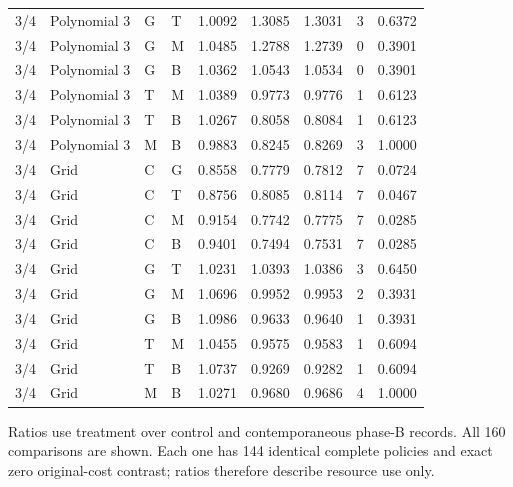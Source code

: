 \begin{longtable}{llllrrrrr}
3/4 & Polynomial 3 & G & T & 1.0092 & 1.3085 & 1.3031 & 3 & 0.6372 \\
3/4 & Polynomial 3 & G & M & 1.0485 & 1.2788 & 1.2739 & 0 & 0.3901 \\
3/4 & Polynomial 3 & G & B & 1.0362 & 1.0543 & 1.0534 & 0 & 0.3901 \\
3/4 & Polynomial 3 & T & M & 1.0389 & 0.9773 & 0.9776 & 1 & 0.6123 \\
3/4 & Polynomial 3 & T & B & 1.0267 & 0.8058 & 0.8084 & 1 & 0.6123 \\
3/4 & Polynomial 3 & M & B & 0.9883 & 0.8245 & 0.8269 & 3 & 1.0000 \\
3/4 & Grid & C & G & 0.8558 & 0.7779 & 0.7812 & 7 & 0.0724 \\
3/4 & Grid & C & T & 0.8756 & 0.8085 & 0.8114 & 7 & 0.0467 \\
3/4 & Grid & C & M & 0.9154 & 0.7742 & 0.7775 & 7 & 0.0285 \\
3/4 & Grid & C & B & 0.9401 & 0.7494 & 0.7531 & 7 & 0.0285 \\
3/4 & Grid & G & T & 1.0231 & 1.0393 & 1.0386 & 3 & 0.6450 \\
3/4 & Grid & G & M & 1.0696 & 0.9952 & 0.9953 & 2 & 0.3931 \\
3/4 & Grid & G & B & 1.0986 & 0.9633 & 0.9640 & 1 & 0.3931 \\
3/4 & Grid & T & M & 1.0455 & 0.9575 & 0.9583 & 1 & 0.6094 \\
3/4 & Grid & T & B & 1.0737 & 0.9269 & 0.9282 & 1 & 0.6094 \\
3/4 & Grid & M & B & 1.0271 & 0.9680 & 0.9686 & 4 & 1.0000 \\
\end{longtable}
\noindent Ratios use treatment over control and contemporaneous phase-B records. All 160 comparisons are shown. Each one has 144 identical complete policies and exact zero original-cost contrast; ratios therefore describe resource use only.
\endgroup
